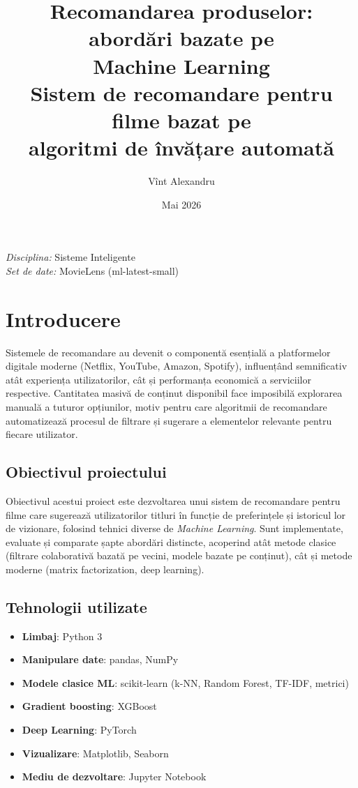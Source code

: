 \documentclass[12pt,a4paper]{article}
\title{
    \vspace{2cm}
    \textbf{Recomandarea produselor: abordări bazate pe \\ Machine Learning} \\
    \vspace{0.5cm}
    \large Sistem de recomandare pentru filme bazat pe \\ algoritmi de învățare automată
}
\author{Vînt Alexandru}
\date{Mai 2026}
\begin{document}
\maketitle
\thispagestyle{empty}
\vspace{2cm}

\begin{center}
\textit{Disciplina:} Sisteme Inteligente \\
\textit{Set de date:} MovieLens (ml-latest-small)
\end{center}

\newpage
\tableofcontents
\newpage

\section{Introducere}

Sistemele de recomandare au devenit o componentă esențială a platformelor digitale moderne (Netflix, YouTube, Amazon, Spotify), influențând semnificativ atât experiența utilizatorilor, cât și performanța economică a serviciilor respective. Cantitatea masivă de conținut disponibil face imposibilă explorarea manuală a tuturor opțiunilor, motiv pentru care algoritmii de recomandare automatizează procesul de filtrare și sugerare a elementelor relevante pentru fiecare utilizator.

\subsection{Obiectivul proiectului}

Obiectivul acestui proiect este dezvoltarea unui sistem de recomandare pentru filme care sugerează utilizatorilor titluri în funcție de preferințele și istoricul lor de vizionare, folosind tehnici diverse de \textit{Machine Learning}. Sunt implementate, evaluate și comparate șapte abordări distincte, acoperind atât metode clasice (filtrare colaborativă bazată pe vecini, modele bazate pe conținut), cât și metode moderne (matrix factorization, deep learning).

\subsection{Tehnologii utilizate}

\begin{itemize}[noitemsep]
    \item \textbf{Limbaj}: Python 3
    \item \textbf{Manipulare date}: pandas, NumPy
    \item \textbf{Modele clasice ML}: scikit-learn (k-NN, Random Forest, TF-IDF, metrici)
    \item \textbf{Gradient boosting}: XGBoost
    \item \textbf{Deep Learning}: PyTorch
    \item \textbf{Vizualizare}: Matplotlib, Seaborn
    \item \textbf{Mediu de dezvoltare}: Jupyter Notebook
\end{itemize}
\end{document}
